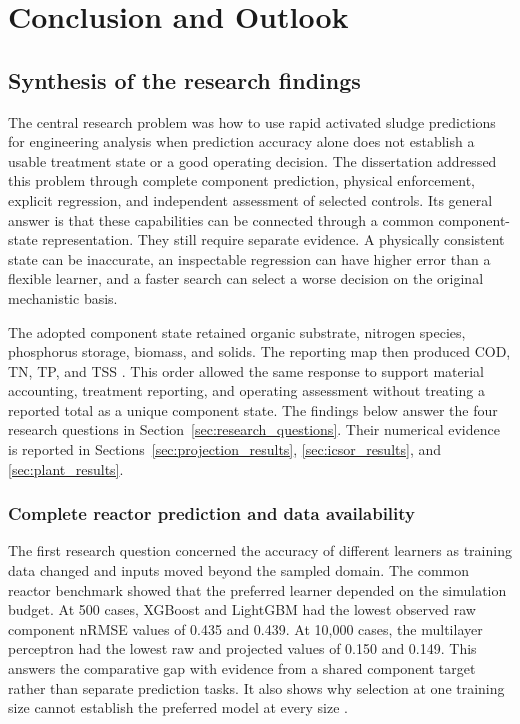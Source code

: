\chapter{Conclusion and Outlook}
\label{ch:conclusion}

\section{Synthesis of the research findings}
\label{sec:assessment_observed_findings}

The central research problem was how to use rapid activated sludge predictions for engineering analysis when prediction accuracy alone does not establish a usable treatment state or a good operating decision. The dissertation addressed this problem through complete component prediction, physical enforcement, explicit regression, and independent assessment of selected controls. Its general answer is that these capabilities can be connected through a common component-state representation. They still require separate evidence. A physically consistent state can be inaccurate, an inspectable regression can have higher error than a flexible learner, and a faster search can select a worse decision on the original mechanistic basis.

The adopted component state retained organic substrate, nitrogen species, phosphorus storage, biomass, and solids. The reporting map then produced COD, TN, TP, and TSS \citep{Henze2006}. This order allowed the same response to support material accounting, treatment reporting, and operating assessment without treating a reported total as a unique component state. The findings below answer the four research questions in Section~\ref{sec:research_questions}. Their numerical evidence is reported in Sections~\ref{sec:projection_results}, \ref{sec:icsor_results}, and \ref{sec:plant_results}.

\subsection{Complete reactor prediction and data availability}

The first research question concerned the accuracy of different learners as training data changed and inputs moved beyond the sampled domain. The common reactor benchmark showed that the preferred learner depended on the simulation budget. At 500 cases, XGBoost and LightGBM had the lowest observed raw component nRMSE values of 0.435 and 0.439. At 10,000 cases, the multilayer perceptron had the lowest raw and projected values of 0.150 and 0.149. This answers the comparative gap with evidence from a shared component target rather than separate prediction tasks. It also shows why selection at one training size cannot establish the preferred model at every size \citep{VieringLoog2023,Borisov2024}.

